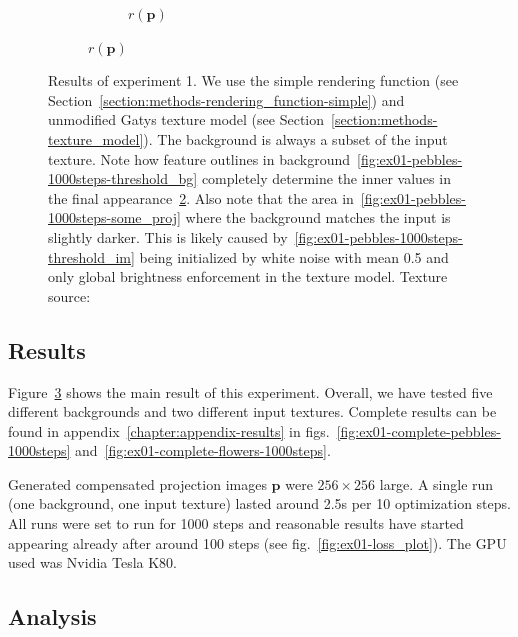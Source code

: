 \begin{figure}[]
\begin{subfigure}{\textwidth}
\begin{subfigure}{0.24\textwidth}
            \caption{\(r(\bm{p})\)}
            \label{fig:ex01-pebbles-1000steps-threshold_proj}
        \end{subfigure}
    \end{subfigure}
    \caption{Results of experiment 1. We use the simple rendering function (see Section~\ref{section:methods-rendering_function-simple}) and unmodified Gatys texture model (see Section~\ref{section:methods-texture_model}). The background is always a subset of the input texture. Note how feature outlines in background~\ref{fig:ex01-pebbles-1000steps-threshold_bg} completely determine the inner values in the final appearance~\ref{fig:ex01-pebbles-1000steps-threshold_proj}. Also note that the area in~\ref{fig:ex01-pebbles-1000steps-some_proj} where the background matches the input is slightly darker. This is likely caused by~\ref{fig:ex01-pebbles-1000steps-threshold_im} being initialized by white noise with mean 0.5 and only global brightness enforcement in the texture model. Texture source: \citet{Gatys2015}}
    \label{fig:ex01-pebbles-1000steps}
\end{figure}

\subsection{Results}
\label{section:results-experiments-01-results}

Figure~\ref{fig:ex01-pebbles-1000steps} shows the main result of this experiment. Overall, we have tested five different backgrounds and two different input textures. Complete results can be found in appendix~\ref{chapter:appendix-results} in figs.~\ref{fig:ex01-complete-pebbles-1000steps} and~\ref{fig:ex01-complete-flowers-1000steps}.

Generated compensated projection images \(\bm{p}\) were \(256 \times 256\) large. A single run (one background, one input texture) lasted around 2.5s per 10 optimization steps. All runs were set to run for 1000 steps and reasonable results have started appearing already after around 100 steps (see fig.~\ref{fig:ex01-loss_plot}). The GPU used was Nvidia Tesla K80.

\subsection{Analysis}
\label{section:results-experiments-01-analysis}

